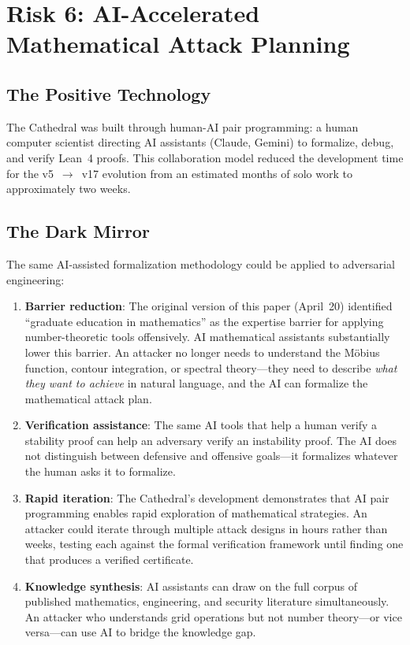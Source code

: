 \documentclass[11pt,a4paper]{article}
\begin{document}
\section{Risk 6: AI-Accelerated Mathematical Attack Planning}
\label{sec:ai}

\subsection{The Positive Technology}

The Cathedral was built through human-AI pair programming: a human
computer scientist directing AI assistants (Claude, Gemini) to formalize,
debug, and verify Lean~4 proofs. This collaboration model reduced the
development time for the v5~$\to$~v17 evolution from an estimated
months of solo work to approximately two weeks.

\subsection{The Dark Mirror}

The same AI-assisted formalization methodology could be applied to
adversarial engineering:

\begin{enumerate}
  \item \textbf{Barrier reduction}: The original version of this paper
    (April~20) identified ``graduate education in mathematics'' as the
    expertise barrier for applying number-theoretic tools offensively.
    AI mathematical assistants substantially lower this barrier. An
    attacker no longer needs to understand the M\"obius function,
    contour integration, or spectral theory---they need to describe
    \emph{what they want to achieve} in natural language, and the AI
    can formalize the mathematical attack plan.

  \item \textbf{Verification assistance}: The same AI tools that
    help a human verify a stability proof can help an adversary verify
    an instability proof. The AI does not distinguish between
    defensive and offensive goals---it formalizes whatever the human
    asks it to formalize.

  \item \textbf{Rapid iteration}: The Cathedral's development
    demonstrates that AI pair programming enables rapid exploration of
    mathematical strategies. An attacker could iterate through
    multiple attack designs in hours rather than weeks, testing each
    against the formal verification framework until finding one that
    produces a verified certificate.

  \item \textbf{Knowledge synthesis}: AI assistants can draw on the
    full corpus of published mathematics, engineering, and security
    literature simultaneously. An attacker who understands grid
    operations but not number theory---or vice versa---can use AI to
    bridge the knowledge gap.
\end{enumerate}
\end{document}

